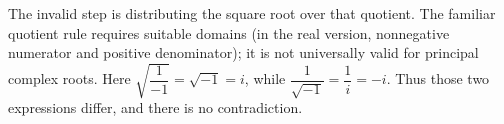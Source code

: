 The invalid step is distributing the square root over that quotient. The familiar quotient rule requires suitable domains (in the real version, nonnegative numerator and positive denominator); it is not universally valid for principal complex roots. Here $\sqrt{\dfrac{1}{-1}}=\sqrt{-1}=i$, while $\dfrac{1}{\sqrt{-1}}=\dfrac{1}{i}=-i$. Thus those two expressions differ, and there is no contradiction.
